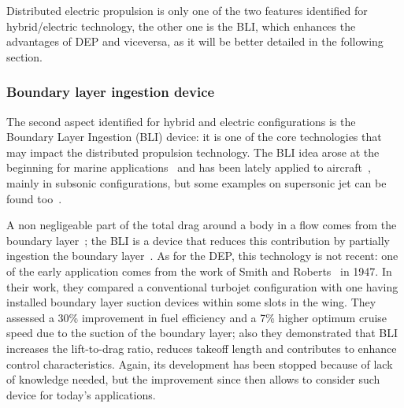 Distributed electric propulsion is only one of the two features identified for hybrid/electric technology, the other one is the BLI, which enhances the advantages of DEP and viceversa, as it will be better detailed in the following section. 

\subsubsection{Boundary layer ingestion device}
\label{subsubsec:chap1_bli_review}

The second aspect identified for hybrid and electric configurations is the Boundary Layer Ingestion (BLI) device: it is one of the core technologies that may impact the distributed propulsion technology.
The BLI idea arose at the beginning for marine applications~\cite{bib:park, bib:roberts} and has been lately applied to aircraft~\cite{bib:tournier, bib:owen, bib:allan, bib:peijian}, mainly in subsonic configurations, but some examples on supersonic jet can be found too~\cite{bib:kumar}.

A non negligeable part of the total drag around a body in a flow comes from the boundary layer~\cite{bib:monti_pt2}; the BLI is a device that reduces this contribution by partially ingestion the boundary layer~\cite{bib:smith}. 
As for the DEP, this technology is not recent: one of the early application comes from the work of Smith and Roberts~\cite{bib:smith_bli} in 1947.
In their work, they compared a conventional turbojet configuration with one having installed boundary layer suction devices within some slots in the wing. 
They assessed a 30\% improvement in fuel efficiency and a 7\% higher optimum cruise speed due to the suction of the boundary layer; also they demonstrated that BLI increases the lift-to-drag ratio, reduces takeoff length and contributes to enhance control characteristics. 
Again, its development has been stopped because of lack of knowledge needed, but the improvement since then allows to consider such device for today's applications.

